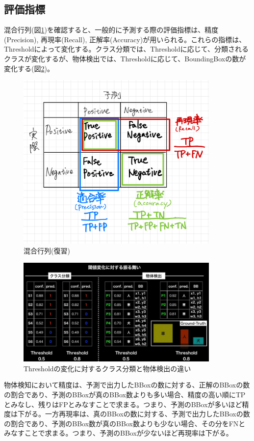\documentclass{ltjsarticle}
\begin{document}
\subsection{評価指標}
混合行列(図\ref{fig:Confusion_Matrix})を確認すると、一般的に予測する際の評価指標は、精度(Precision), 再現率(Recall), 正解率(Accuracy)が用いられる。これらの指標は、Thresholdによって変化する。クラス分類では、Thresholdに応じて、分類されるクラスが変化するが、物体検出では、Thresholdに応じて、BoundingBoxの数が変化する(図\ref{fig:Threshold})。
\begin{figure}[htbp]
  \centering
  \includegraphics[width=10cm]{./capture/Confusion_Matrix.png}
  \caption{混合行列(復習)}
  \label{fig:Confusion_Matrix}
\end{figure}
\begin{figure}[htbp]
  \centering
  \includegraphics[width=10cm]{./capture/Threshold.png}
  \caption{Thresholdの変化に対するクラス分類と物体検出の違い}
  \label{fig:Threshold}
\end{figure}
\par
物体検知において精度は、予測で出力したBBoxの数に対する、正解のBBoxの数の割合であり、予測のBBoxが真のBBox数よりも多い場合、精度の高い順にTPとみなし、残りはFPとみなすことで求まる。つまり、予測のBBoxが多いほど精度は下がる。一方再現率は、真のBBoxの数に対する、予測で出力したBBoxの数の割合であり、予測のBBox数が真のBBox数よりも少ない場合、その分をFNとみなすことで求まる。つまり、予測のBBoxが少ないほど再現率は下がる。
\end{document}
